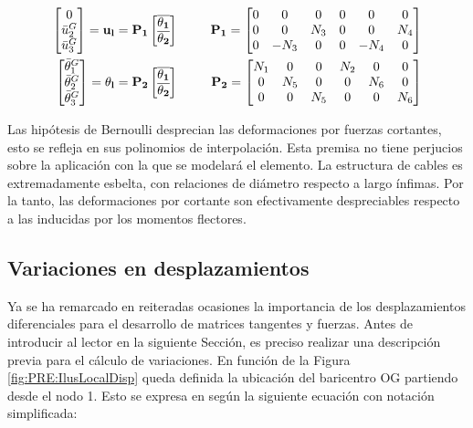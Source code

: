  \begin{eqnarray}
 	\label{Eqn:PRE:CompactTransveralDisp}
		\begin{bmatrix}
			0     \\
		\bar{u}_2^G \\
		\bar{u}_3^G
	\end{bmatrix}=\bf{u_l}=\bf{P}_1
	\begin{bmatrix}
			\overline{\bf{\theta_1}}\\
			\overline{\bf{\theta_2}}
	\end{bmatrix} &~~~~~ &
	\bf{P}_1 = \begin{bmatrix}
		 0 &   0  & 0 & 0  & 0 & 0 \\
		 0  &  0 & N_3 & 0 & 0 & N_4 \\
		 0  &  -N_3  & 0 & 0 & -N_4 & 0
	\end{bmatrix} \\
	\label{Eqn:PRE:CompactTransversalAngs}
		\begin{bmatrix}
			\bar{\theta}_1^G\\
			\bar{\theta}_2^G \\
			\bar{\theta}_3^G
		\end{bmatrix}=\bf{\theta_l}=\bf{P}_2
		\begin{bmatrix}
			\overline{\bf{\theta_1}}\\
			\overline{\bf{\theta_2}}
		\end{bmatrix}& ~~~~~ &\bf{P}_2=
	\begin{bmatrix}
	N_1 & 0 & 0 & N_2 & 0 & 0 \\
	0  & N_5 & 0 & 0 &N_6 &0 \\
	0  &  0  & N_5 & 0 & 0 &N_6
	\end{bmatrix}
 \end{eqnarray}

Las hipótesis de Bernoulli desprecian las deformaciones por fuerzas cortantes, esto se refleja en sus polinomios de interpolación. Esta premisa no tiene perjucios sobre la aplicación con la que se modelará el elemento. La estructura de cables es extremadamente esbelta, con relaciones de diámetro respecto a largo ínfimas. Por la tanto, las deformaciones por cortante son efectivamente despreciables respecto a las inducidas por los momentos flectores.

\subsection{Variaciones en desplazamientos} \label{Sec:PRE:VariacionesDesplazamientos}
Ya se ha remarcado en reiteradas ocasiones la importancia de los desplazamientos diferenciales para el desarrollo de matrices tangentes y fuerzas. Antes de introducir al lector en la siguiente Sección, es preciso realizar una descripción previa para el cálculo de variaciones. En función de la Figura \ref{fig:PRE:IlusLocalDisp} queda definida la ubicación del baricentro OG partiendo desde el nodo 1. Esto se expresa en según la siguiente ecuación con notación simplificada:

